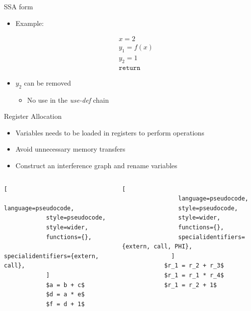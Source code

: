 
\begin{frame}[fragile]{SSA form}

\begin{itemize}
    \item Example:

\begin{align}
& x = 2 \nonumber \\
& y_1 = f(x) \nonumber \\
& y_2 = 1 \nonumber \\
& \texttt{return} \nonumber
\end{align}
    \item $y_2$ can be removed
    \begin{itemize}
        \item No use in the \textit{use-def} chain
    \end{itemize}

\end{itemize}
\end{frame}


\begin{frame}[fragile]{Register Allocation}

\begin{itemize}
    \item Variables needs to be loaded in registers to perform operations
    \item Avoid unnecessary memory transfers
    \item Construct an interference graph and rename variables
\end{itemize}

\begin{columns}[c]
        \begin{lstlisting}[
            language=pseudocode,
            style=pseudocode,
            style=wider,
            functions={},
            specialidentifiers={extern, call},
            ]
			$a = b + c$
			$d = a * e$
			$f = d + 1$ 
        \end{lstlisting}
        \begin{lstlisting}[
                language=pseudocode,
                style=pseudocode,
                style=wider,
                functions={},
                specialidentifiers={extern, call, PHI},
              ]
			$r_1 = r_2 + r_3$
			$r_1 = r_1 * r_4$
			$r_1 = r_2 + 1$
        \end{lstlisting}
\end{columns}
\end{frame}

